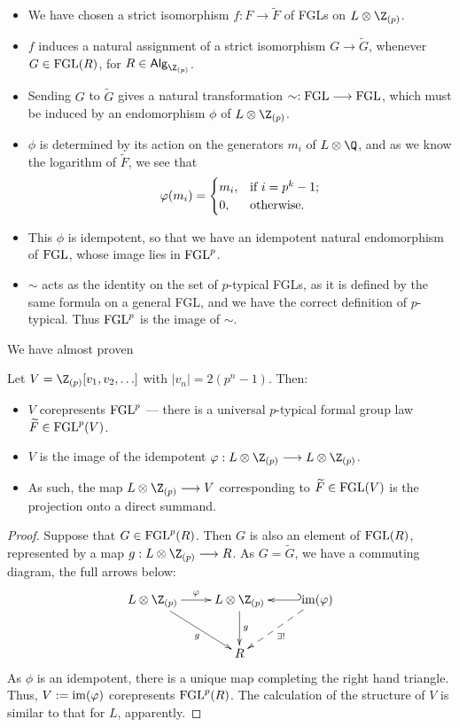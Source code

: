 \documentclass[11pt]{article}
\newcommand{\FGL}{\textup{FGL}}
\newcommand{\FGLp}{\textup{FGL}^{p}}
\newcommand{\ZpAlg}{\textsf{Alg}_{\Z_{(p)}}}
\begin{document}
\begin{Formal Group Laws}
\begin{itemise}
\begin{itemize}
\item We have chosen a strict isomorphism $f:F\to\widetilde{F}$ of FGLs on $L\otimes\Z_{(p)}$. \item $f$ induces a natural assignment of a strict isomorphism $G\to\widetilde{G}$, whenever $G\in\FGL(R)$, for $R\in\ZpAlg$.
\item Sending $G$ to $\widetilde{G}$ gives a natural transformation $\sim:\FGL\to\FGL$, which must be induced by an endomorphism $\phi$ of $L\otimes\Z_{(p)}$.
\item $\phi$ is determined by its action on the generators $m_i$ of ${L}\otimes{\Q}$, and as we know the logarithm of $\widetilde{F}$, we see that
\[\phi(m_i)=\begin{cases}
m_i,&\textup{if }i=p^k-1;\\
0,&\textup{otherwise}.
\end{cases}
\]
\item This $\phi$ is idempotent, so that we have an idempotent natural endomorphism of $\FGL$, whose image lies in $\FGLp$.
\item $\sim$ acts as the identity on the set of $p$-typical FGLs, as it is defined by the same formula on a general FGL, and we have the correct definition of $p$-typical. Thus $\FGLp$ is the image of $\sim$.
\end{itemize}
We have almost proven
\begin{thm*}
Let $V=\Z_{(p)}[v_1,v_2,\ldots]$ with $|v_n|=2(p^n-1)$. Then:
\begin{itemize}\squishlist
\item  $V$ corepresents $\FGLp$ --- there is a universal $p$-typical formal group law $\widetilde{F}\in\FGLp(V)$.
\item $V$ is the image of the idempotent $\phi:{L}\otimes{\Z_{(p)}}\to{L}\otimes{\Z_{(p)}}$.
\item As such, the map ${L}\otimes{\Z_{(p)}}\to V$ corresponding to $\widetilde{F}\in\FGL(V)$ is the projection onto a direct summand.
\end{itemize}
\end{thm*}
\begin{proof}
Suppose that $G\in\FGLp(R)$. Then $G$ is also an element of $\FGL(R)$, represented by a map $g:L\otimes\Z_{(p)}\to R$. As $G=\widetilde{G}$, we have a commuting diagram, the full arrows below:
\[\xymatrix@R=1cm{
L\otimes\Z_{(p)}\ar[r]^-{\phi}\ar[dr]_-{g}&%
L\otimes\Z_{(p)}\ar[d]^-{g}&
\im(\phi)\ar@{_{(}->}[l]\ar@{-->}[ld]^-{\exists !}\\
&%
R%
}\]
As $\phi$ is an idempotent, there is a unique map completing the right hand triangle. Thus, $V:=\im(\phi)$ corepresents $\FGLp(R)$. The calculation of the structure of $V$ is similar to that for $L$, apparently.
\end{proof}
\end{itemise}

\end{Formal Group Laws}
\end{document}
